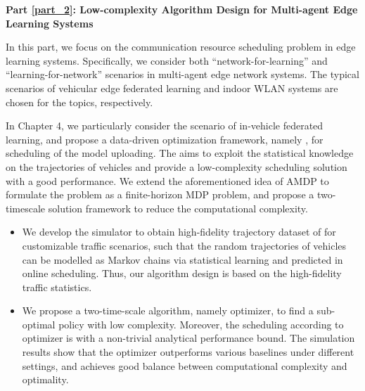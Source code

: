 \indent\textbf{Part \ref{part_2}: Low-complexity Algorithm Design for Multi-agent Edge Learning Systems}

In this part, we focus on the communication resource scheduling problem in edge learning systems.
Specifically, we consider both ``network-for-learning'' and ``learning-for-network'' scenarios in multi-agent edge network systems. The typical scenarios of vehicular edge federated learning and indoor WLAN systems are chosen for the topics, respectively.

In Chapter 4, we particularly consider the scenario of in-vehicle federated learning, and propose a data-driven optimization framework, namely {\fwName}, for scheduling of the model uploading.
The {\fwName} aims to exploit the statistical knowledge on the trajectories of vehicles and provide a low-complexity scheduling solution with a good performance.
We extend the aforementioned idea of AMDP to formulate the problem as a finite-horizon MDP problem, and propose a two-timescale solution framework to reduce the computational complexity.
\begin{itemize}
    \item We develop the {\fwName} simulator to obtain high-fidelity trajectory dataset of {\IAVs} for customizable traffic scenarios, such that the random trajectories of vehicles can be modelled as Markov chains via statistical learning and predicted in online scheduling. Thus, our algorithm design is based on the high-fidelity traffic statistics.
    \item We propose a two-time-scale algorithm, namely {\fwName} optimizer, to find a sub-optimal policy with low complexity. Moreover, the scheduling according to {\fwName} optimizer is with a non-trivial analytical performance bound. The simulation results show that the {\fwName} optimizer outperforms various baselines under different settings, and achieves good balance between computational complexity and optimality.
\end{itemize}

%

